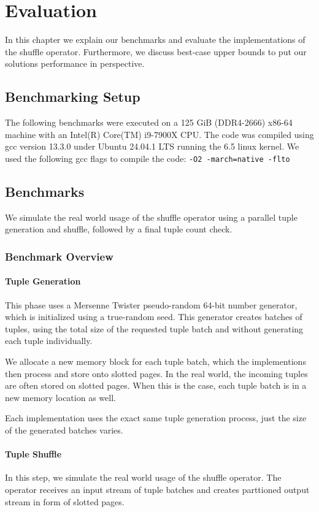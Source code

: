 
\chapter{Evaluation}\label{chapter:evaluation}
In this chapter we explain our benchmarks and evaluate the implementations of the shuffle operator.
Furthermore, we discuss best-case upper bounds to put our solutions performance in perspective.
\section{Benchmarking Setup}
The following benchmarks were executed on a 125 GiB (DDR4-2666) x86-64 machine with an Intel(R) Core(TM) i9-7900X CPU.
The code was compiled using gcc version 13.3.0 under Ubuntu 24.04.1 LTS running the 6.5 linux kernel.
We used the following gcc flags to compile the code: \texttt{-O2 -march=native -flto}

\section{Benchmarks} We simulate the real world usage of the shuffle operator using a parallel tuple generation and shuffle, followed by a final tuple count check.

\subsection{Benchmark Overview}
\subsubsection{Tuple Generation}
This phase uses a Mersenne Twister pseudo-random 64-bit number generator, which is initialized using a true-random seed.
This generator creates batches of tuples, using the total size of the requested tuple batch and without generating each tuple individually.

We allocate a new memory block for each tuple batch, which the implementions then process and store onto slotted pages.
In the real world, the incoming tuples are often stored on slotted pages.
When this is the case, each tuple batch is in a new memory location as well.

Each implementation uses the exact same tuple generation process, just the size of the generated batches varies.
\subsubsection{Tuple Shuffle}
In this step, we simulate the real world usage of the shuffle operator.
The operator receives an input stream of tuple batches and creates parttioned output stream in form of slotted pages.


